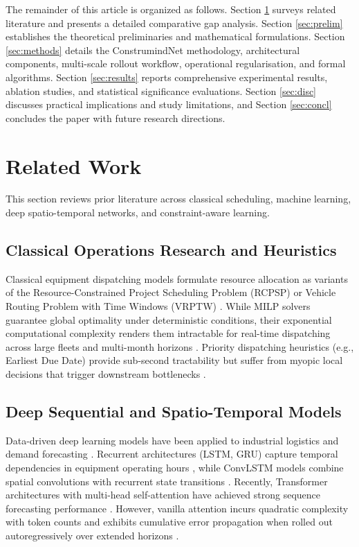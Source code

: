 \documentclass[11pt,a4paper]{article}
\begin{document}
The remainder of this article is organized as follows. Section \ref{sec:related} surveys related literature and presents a detailed comparative gap analysis. Section \ref{sec:prelim} establishes the theoretical preliminaries and mathematical formulations. Section \ref{sec:methods} details the ConstrumindNet methodology, architectural components, multi-scale rollout workflow, operational regularisation, and formal algorithms. Section \ref{sec:results} reports comprehensive experimental results, ablation studies, and statistical significance evaluations. Section \ref{sec:disc} discusses practical implications and study limitations, and Section \ref{sec:concl} concludes the paper with future research directions.

\section{Related Work}\label{sec:related}
This section reviews prior literature across classical scheduling, machine learning, deep spatio-temporal networks, and constraint-aware learning.

\subsection{Classical Operations Research and Heuristics}
Classical equipment dispatching models formulate resource allocation as variants of the Resource-Constrained Project Scheduling Problem (RCPSP) or Vehicle Routing Problem with Time Windows (VRPTW) \cite{hossain2025,meng2025}. While MILP solvers guarantee global optimality under deterministic conditions, their exponential computational complexity renders them intractable for real-time dispatching across large fleets and multi-month horizons \cite{wang2025}. Priority dispatching heuristics (e.g., Earliest Due Date) provide sub-second tractability but suffer from myopic local decisions that trigger downstream bottlenecks \cite{ejiyi2025}.

\subsection{Deep Sequential and Spatio-Temporal Models}
Data-driven deep learning models have been applied to industrial logistics and demand forecasting \cite{russo2025,chiranjeevi2025}. Recurrent architectures (LSTM, GRU) capture temporal dependencies in equipment operating hours \cite{inam2024}, while ConvLSTM models combine spatial convolutions with recurrent state transitions \cite{shin2023}. Recently, Transformer architectures with multi-head self-attention have achieved strong sequence forecasting performance \cite{inam2025a,li2025}. However, vanilla attention incurs quadratic complexity with token counts and exhibits cumulative error propagation when rolled out autoregressively over extended horizons \cite{liu2025}.
\end{document}
